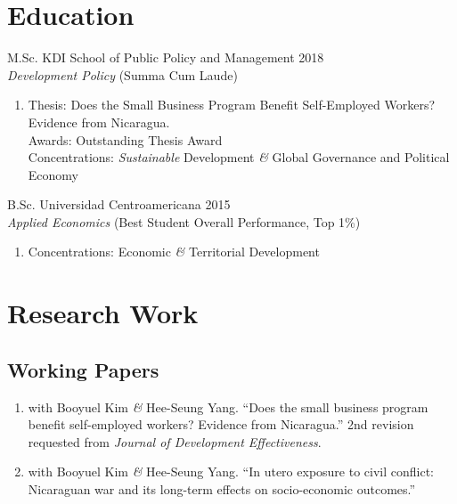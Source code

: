 \documentclass[a4paper, 10pt]{article}
\renewenvironment{itemize}{
  \begin{list}{}
    { \setlength{\itemsep}{5pt}
      \setlength{\parsep}{0pt}
      \setlength{\topsep}{0pt}
      \setlength{\leftmargin}{0em} } }{
  \end{list}}
\begin{document}
\section*{Education}

\begin{itemize}
\item M.Sc. KDI School of Public Policy and Management \hfill 2018 \\
{\small \textit{Development Policy} (Summa Cum Laude)}
  
  \begin{enumerate}[leftmargin=10pt, label={}, nosep]
    \item  Thesis: Does the Small Business Program Benefit Self-Employed Workers? Evidence from Nicaragua. \\ Awards: Outstanding Thesis Award \\ Concentrations: \emph{Sustainable} Development \textit{\&} Global Governance and Political Economy
  \end{enumerate}
\item B.Sc. Universidad Centroamericana \hfill 2015 \\
{\small \textit{Applied Economics} (Best Student Overall Performance, Top 1\%)}
  
  \begin{enumerate}[leftmargin=10pt, label={}, nosep]
    \item Concentrations: Economic \textit{\&} Territorial Development
  \end{enumerate}
\end{itemize}


\section*{Research Work}

\subsection*{Working Papers}

\begin{enumerate}[leftmargin=10pt, label={}, itemindent=-10pt, nosep]
\item with Booyuel Kim \textit{\&} Hee-Seung Yang. ``Does the small business program benefit self-employed workers? Evidence from Nicaragua.'' 2nd revision requested from \textit{Journal of Development Effectiveness}.
\item with Booyuel Kim \textit{\&} Hee-Seung Yang. ``In utero exposure to civil conflict: Nicaraguan war and its long-term effects on socio-economic outcomes.''
\end{enumerate}
\end{document}
